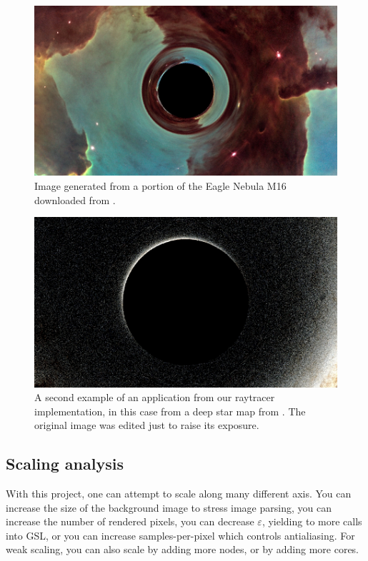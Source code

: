 \begin{figure}[h]
  \centering
  \includegraphics[width=0.8\linewidth]{figs/eagle_render}
  \caption{Image generated from a portion of the Eagle Nebula M16 downloaded from \cite{esa-pillars}.}
  \label{fig:eagle}
\end{figure}


\begin{figure}[h]
  \centering
  \includegraphics[width=0.8\linewidth]{figs/starry_render}
  \caption{A second example of an application from our raytracer implementation,
	in this case from a deep star map from \cite{deepstarmap-nasa_svs}.
	The original image was edited just to raise its exposure.}
  \label{fig:starry}
\end{figure}




\subsection{Scaling analysis}

With this project, one can attempt to scale along many different axis. You can increase the size of the background image to stress image parsing, you can increase the number of rendered pixels, you can decrease $\varepsilon$, yielding to more calls into GSL, or you can increase samples-per-pixel which controls antialiasing. For weak scaling, you can also scale by adding more nodes, or by adding more cores. 

